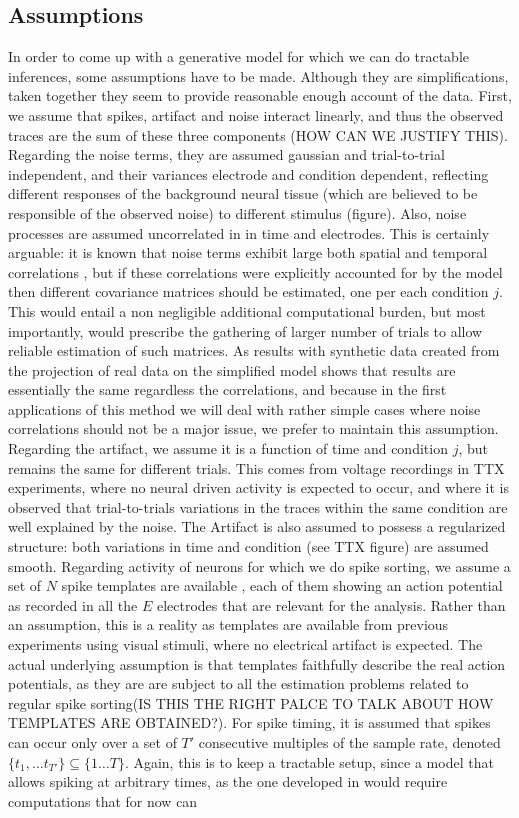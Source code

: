 \documentclass[12pt,letterpaper,fleqn]{article}
\begin{document}
\subsection{Assumptions}
In order to come up with a generative model for which we can do tractable inferences, some assumptions have to be made. Although they are simplifications, taken together they seem to provide reasonable enough account of the data. First, we assume that spikes, artifact and noise interact linearly, and thus the observed traces are the sum of these three components (HOW CAN WE JUSTIFY THIS). Regarding the noise terms, they are assumed gaussian and trial-to-trial independent, and their variances electrode and condition dependent, reflecting different responses of the background neural tissue (which are believed to be responsible of the observed noise) to different stimulus (figure). Also, noise processes are assumed uncorrelated in  in time and electrodes. This is certainly arguable: it is known that noise terms exhibit large both spatial and temporal correlations \cite{PillowShlens}, but if these correlations were explicitly accounted for by the model then different covariance matrices should be estimated, one per each condition $j$. This would entail a non negligible additional computational burden, but most importantly, would prescribe the gathering of larger number of trials to allow reliable estimation of such matrices. As results with synthetic data created from the projection of real data on the simplified model shows that results are essentially the same regardless the correlations, and because in the first applications of this method we will deal with rather simple cases where noise correlations should not be a major issue, we prefer to maintain this assumption. Regarding the artifact, we assume it is a function of time and condition $j$, but remains the same for different trials. This comes from voltage recordings in TTX experiments, where no neural driven activity is expected to occur, and where it is observed that trial-to-trials variations in the traces within the same condition are well explained by the noise. The Artifact is also assumed to possess a regularized structure: both variations in time and condition (see TTX figure) are assumed smooth. Regarding activity of neurons for which we do spike sorting, we assume a set of $N$ spike templates are available , each of them showing an action potential as recorded in all the $E$ electrodes that are relevant for the analysis. Rather than an assumption, this is a reality as templates are available from previous experiments using visual stimuli, where no electrical artifact is expected. The actual underlying assumption is that templates faithfully describe the real action potentials, as they are are subject to all the estimation problems related to regular spike sorting(IS THIS THE RIGHT PALCE TO TALK ABOUT HOW TEMPLATES ARE OBTAINED?). For spike timing, it is assumed that spikes can occur only over a set of $T'$ consecutive multiples of the sample rate, denoted $\{t_1,\ldots t_{T'}\}\subseteq \{1\ldots T\}$. Again, this is to keep a tractable setup, since a model that allows spiking at arbitrary times, as the one developed in \cite{EkanadhamTS11} would require computations that for now can 
\end{document}
